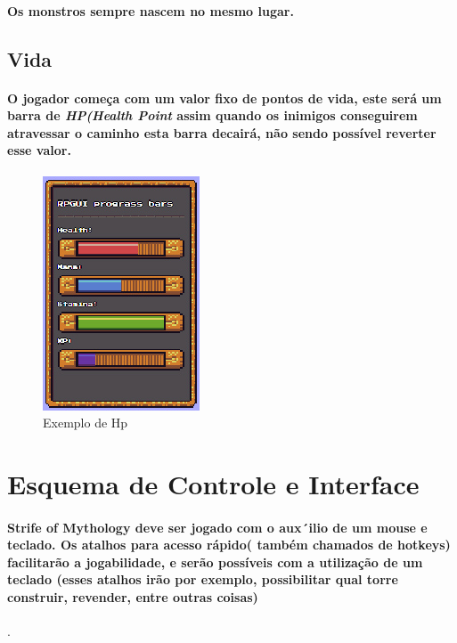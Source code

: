 \documentclass[11pt]{article} %
\begin{document}
\paragraph{Os monstros sempre nascem no mesmo lugar.}

\subsection{Vida}
\paragraph{O jogador começa com um valor fixo de pontos de vida, este será um barra de \textit{HP(Health Point} assim quando os inimigos conseguirem atravessar o caminho esta barra decairá, não sendo possível reverter esse valor.}

\begin{figure}[!htp]
\centering
\includegraphics[scale=0.3]{res/hp.png}
\caption{Exemplo de Hp}
\label{Mecânicas}
\end{figure}


\section*{Esquema de Controle e Interface}
\paragraph{Strife of Mythology deve ser jogado com o aux´ilio de um mouse e teclado. Os atalhos para acesso rápido( também chamados de hotkeys) facilitarão  a jogabilidade, e serão possíveis com a utilização de um teclado (esses atalhos irão por exemplo, possibilitar qual torre construir, revender, entre outras coisas)}.
\end{document}
